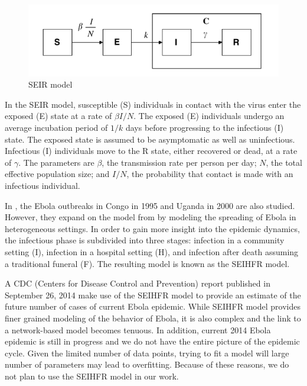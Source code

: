 \documentclass[10pt, journal,onecolumn]{IEEEtran}
\begin{document}
\begin{figure}[h!]
\captionsetup{justification=centering}
\includegraphics[scale=0.4]{seir_model_fig}
\centering\caption{SEIR model}
\label{fig:SEIR_model}
\end{figure}

In the SEIR model, susceptible (S) individuals in contact with the virus enter the exposed (E) state
at a rate of $\beta I / N$.
The exposed (E) individuals undergo an average incubation period of $1/k$ days before progressing to
the infectious (I) state. The exposed state is assumed to be asymptomatic as well as uninfectious.
Infectious (I) individuals move to the R state, either recovered or dead, at a rate of $\gamma$.
 The parameters are $\beta$, the transmission rate per person per day;
$N$, the total effective population size; and $I/N$, the probability that contact is made with
an infectious individual.

In \citep{legrand2007understanding}, the Ebola outbreaks in Congo in 1995 and Uganda in 2000
are also studied. However, they expand on the model from \citep{chowell2004basic} by modeling the spreading of Ebola in heterogeneous settings. In order to gain more insight into the epidemic dynamics,
the infectious phase is subdivided into three stages: infection in a community setting (I), infection in a hospital setting (H), and infection after death assuming a traditional funeral (F). The resulting model is known
as the SEIHFR model. 

A CDC (Centers for Disease Control and Prevention) report \citep{meltzer2014estimating} published in September 26, 2014 make use of the SEIHFR model to provide an estimate of the future number of cases of current Ebola epidemic. While SEIHFR model provides finer grained modeling of the behavior of Ebola, it is also complex and the link to a network-based model becomes tenuous. In addition, current 2014 Ebola epidemic is still in progress and we do not have the entire picture of the epidemic cycle. Given the limited number of data points, trying to fit a model will large number of parameters may lead to overfitting.  Because of these reasons, we do not plan to use the SEIHFR model in our work.
\end{document}

